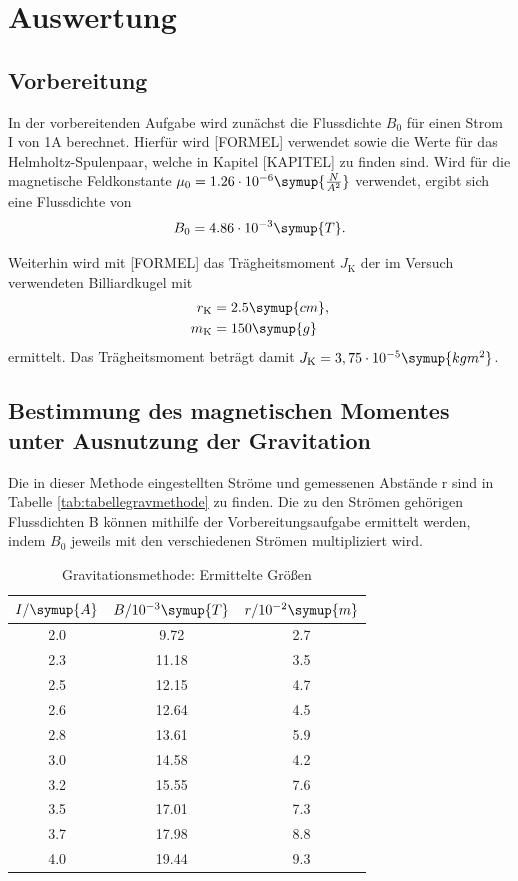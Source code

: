 \section{Auswertung}
\subsection{Vorbereitung}
In der vorbereitenden Aufgabe wird zunächst die Flussdichte $B_0$ für einen Strom I von 1A berechnet. Hierfür wird [FORMEL] verwendet
sowie die Werte für das Helmholtz-Spulenpaar, welche in Kapitel [KAPITEL] zu finden sind.
Wird für die magnetische Feldkonstante $\mu_0 = 1.26 \cdot 10^{-6} \symup{\frac{N}{A^2}}$ verwendet, ergibt sich eine Flussdichte
von 
\begin{equation*}
B_0 = 4.86\cdot 10^{-3} \symup{T}.
\end{equation*}

Weiterhin wird mit [FORMEL] das Trägheitsmoment $J_{\text{K}}$ der im Versuch verwendeten Billiardkugel mit 
\begin{equation*}
\begin{aligned}
r_{\text{K}} &= 2.5\symup{cm}, \\
m_{\text{K}} &= 150\symup{g}
\end{aligned}
\end{equation*}
ermittelt. Das Trägheitsmoment beträgt damit $J_{\text{K}} = 3,75 \cdot 10^{-5} \symup{kg m^2}$.


\subsection{Bestimmung des magnetischen Momentes unter Ausnutzung der Gravitation}
Die in dieser Methode eingestellten Ströme und gemessenen Abstände r sind in Tabelle \eqref{tab:tabellegravmethode} zu finden. Die zu 
den Strömen gehörigen Flussdichten B können mithilfe der Vorbereitungsaufgabe ermittelt werden, indem $B_0$ jeweils mit den 
verschiedenen Strömen multipliziert wird.

\begin{table}[htbp]
\centering
\caption{Gravitationsmethode: Ermittelte Größen}
\label{tab:tabellegravmethode}
\begin{tabular}{S[table-format=1.1] S[table-format=2.2] S[table-format=1.1]}
\toprule
 {$I/\symup{A}$} & {$B/10^{-3}\symup{T}$} & {$r/10^{-2}\symup{m}$} \\
 &  9.72 & 2.7 \\
2.3 & 11.18 & 3.5 \\
2.5 & 12.15 & 4.7 \\
2.6 & 12.64 & 4.5 \\
2.8 & 13.61 & 5.9 \\
3.0 & 14.58 & 4.2 \\
3.2 & 15.55 & 7.6 \\
3.5 & 17.01 & 7.3 \\
3.7 & 17.98 & 8.8 \\
4.0 & 19.44 & 9.3 \\

\bottomrule
\end{tabular}
\end{table}

